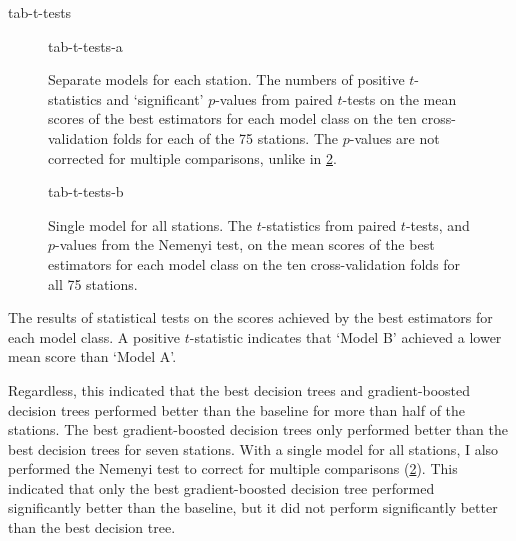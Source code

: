{tab-t-tests}

\begin{table}
  \centering
  \begin{subfigure}{\textwidth}
    \centering
    {tab-t-tests-a}
    \caption{
      Separate models for each station.
      The numbers of positive $t$-statistics and `significant' $p$-values from paired
      $t$-tests on the mean scores of the best estimators for each model class on the ten
      cross-validation folds for each of the 75 stations.
      The $p$-values are not corrected for multiple comparisons, unlike in
      \cref{sub-task-1:tab-t-tests-b}.
    }
    \label{sub-task-1:tab-t-tests-a}
  \end{subfigure}
  \subfigurespace
  \begin{subfigure}{\textwidth}
    \centering
    {tab-t-tests-b}
    \caption{
      Single model for all stations.
      The $t$-statistics from paired $t$-tests, and $p$-values from the Nemenyi test, on the
      mean scores of the best estimators for each model class on the ten cross-validation
      folds for all 75 stations.
    }
    \label{sub-task-1:tab-t-tests-b}
  \end{subfigure}
  \caption{
    The results of statistical tests on the scores achieved by the best estimators for each model class.
    A positive $t$-statistic indicates that `Model B' achieved a lower mean score than
    `Model A'.
  }
  \label{sub-task-1:tab-t-tests}
\end{table}

Regardless, this indicated that the best decision trees and gradient-boosted decision
trees performed better than the baseline for more than half of the stations.
The best gradient-boosted decision trees only performed better than the best decision
trees for seven stations.
With a single model for all stations, I also performed the Nemenyi test to correct for
multiple comparisons (\cref{sub-task-1:tab-t-tests-b}).
This indicated that only the best gradient-boosted decision tree performed
significantly better than the baseline, but it did not perform significantly better
than the best decision tree.
